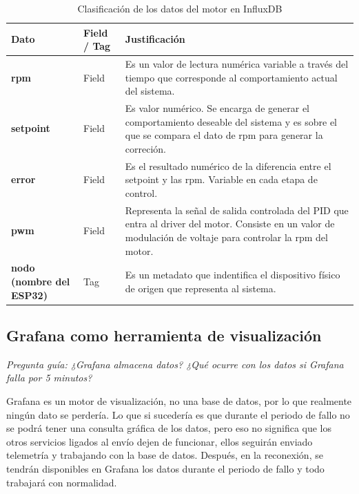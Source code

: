 \documentclass[11pt, letterpaper]{article}
\begin{document}
\begin{table}[H]
  \centering
  \begin{tabular}{>{\bfseries}p{3cm}
                  >{\centering\arraybackslash}p{2cm}
                  p{8cm}}
    \toprule
    \textbf{Dato} & \textbf{Field / Tag} & \textbf{Justificaci\'on} \\
    \midrule
    rpm     & Field& Es un valor de lectura numérica variable a través del tiempo que corresponde al comportamiento actual del sistema.\\[1.2em]
    setpoint & Field& Es valor numérico. Se encarga de generar el comportamiento deseable del sistema y es sobre el que se compara el dato de rpm para generar la correción.\\[1.2em]
    error    & Field& Es el resultado numérico de la diferencia entre el setpoint y las rpm. Variable en cada etapa de control.\\[1.2em]
    pwm      & Field& Representa la señal de salida controlada del PID que entra al driver del motor. Consiste en un valor de modulación de voltaje para controlar la rpm del motor.\\[1.2em]
    nodo (nombre del ESP32) & Tag& Es un metadato que indentifica el dispositivo físico de origen que representa al sistema.\\[1.2em]
    \bottomrule
  \end{tabular}
  \caption{Clasificaci\'on de los datos del motor en InfluxDB}
\end{table}

\subsection{Grafana como herramienta de visualización}

\textit{Pregunta gu\'ia: ¿Grafana almacena datos? ¿Qu\'e ocurre
con los datos si Grafana falla por 5 minutos?}

Grafana es un motor de visualizaci\'on, no una base de datos, por lo que realmente ning\'un dato se perder\'ia. Lo que si suceder\'ia es que durante el periodo de fallo no se podr\'a tener una consulta gr\'afica de los datos, pero eso no significa que los otros servicios ligados al env\'io dejen de funcionar, ellos seguir\'an enviado telemetr\'ia y trabajando con la base de datos. Despu\'es, en la reconexi\'on, se tendr\'an disponibles en Grafana los datos durante el periodo de fallo y todo trabajar\'a con normalidad.
\end{document}
